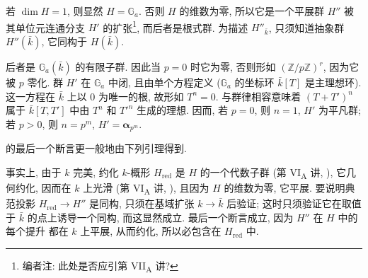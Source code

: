 
若 \(\dim H=1\), 则显然 \(H=\mathbb G_a\). 否则 \(H\) 的维数为零,
所以它是一个平展群 \(H''\) 被其单位元连通分支 \(H'\) 的扩张\footnote{编者注:
此处是否应引第 VII\textsubscript{A} 讲?}, 而后者是根式群.
为描述 \(H''_{\bar{k}}\), 只须知道抽象群 \(H''(\bar{k})\), 它同构于 \(H(\bar{k})\).

后者是 \(\mathbb G_a(\bar{k})\) 的有限子群. 因此当 \(p=0\) 时它为零,
否则形如 \((\mathbb Z/p\mathbb Z)^r\), 因为它被 \(p\) 零化.
群 \(H'\) 在 \(\mathbb G_a\) 中闭, 且由单个方程定义
(\(\mathbb G_a\) 的坐标环 \(\bar{k}[T]\) 是主理想环).
这一方程在 \(\bar{k}\) 上以 \(0\) 为唯一的根, 故形如 \(T^n=0\).
与群律相容意味着 \((T+T')^n\) 属于 \(\bar{k}[T,T']\) 中由 \(T^n\) 和 \(T'^n\)
生成的理想. 因而, 若 \(p=0\), 则 \(n=1\), \(H'\) 为平凡群;
若 \(p>0\), 则 \(n=p^m\), \(H'=\boldsymbol\alpha_{p^m}\).

 的最后一个断言更一般地由下列引理得到.


事实上, 由于 \(k\) 完美, 约化 \(k\)-概形 \(H_{\mathrm{red}}\) 是 \(H\) 的一个代数子群
(第 VI\textsubscript{A} 讲, ), 它几何约化,
因而在 \(k\) 上光滑 (第 VI\textsubscript{A} 讲, ),
且因为 \(H\) 的维数为零, 它平展. 要说明典范投影 \(H_{\mathrm{red}}\to H''\)
是同构, 只须在基域扩张 \(k\to\bar{k}\) 后验证; 这时只须验证它在取值于 \(\bar{k}\)
的点上诱导一个同构, 而这显然成立. 最后一个断言成立, 因为 \(H''\) 在 \(H\) 中的每个提升
都在 \(k\) 上平展, 从而约化, 所以必包含在 \(H_{\mathrm{red}}\) 中.

